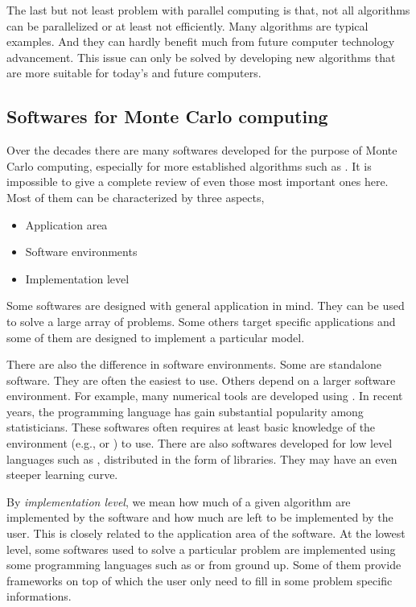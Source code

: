 The last but not least problem with parallel computing is that, not all
algorithms can be parallelized or at least not efficiently. Many \mcmc
algorithms are typical examples. And they can hardly benefit much from future
computer technology advancement. This issue can only be solved by developing
new algorithms that are more suitable for today's and future computers.

\subsection{Softwares for Monte Carlo computing}
\label{sub:Softwares for Monte Carlo computing}

Over the decades there are many softwares developed for the purpose of Monte
Carlo computing, especially for more established algorithms such as \mcmc. It
is impossible to give a complete review of even those most important ones
here. Most of them can be characterized by three aspects,
\begin{itemize}
  \item Application area
  \item Software environments
  \item Implementation level
\end{itemize}
Some softwares are designed with general application in mind. They can be used
to solve a large array of problems. Some others target specific applications
and some of them are designed to implement a particular model.

There are also the difference in software environments. Some are standalone
software. They are often the easiest to use. Others depend on a larger
software environment. For example, many numerical tools are developed using
\matlab \cite{matlab}. In recent years, the \rlang programming language
\cite{rlang} has gain substantial popularity among statisticians. These
softwares often requires at least basic knowledge of the environment (e.g.,
\matlab or \rlang) to use. There are also softwares developed for low level
languages such as \cpp, distributed in the form of libraries. They may have an
even steeper learning curve.

By \emph{implementation level}, we mean how much of a given algorithm are
implemented by the software and how much are left to be implemented by the
user. This is closely related to the application area of the software. At the
lowest level, some softwares used to solve a particular problem are
implemented using some programming languages such as \rlang or \cpp from
ground up. Some of them provide frameworks on top of which the user only need
to fill in some problem specific informations.

